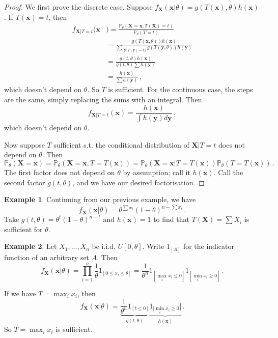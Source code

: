 \documentclass[a4paper,11pt]{article}
\theoremstyle{definition}
\newtheorem*{ex}{Example}
\numberwithin{equation}{section}
\begin{document}
\begin{proof}
We first prove the discrete case. Suppose $f_\mathbf{X}(\mathbf{x}|\theta)=g(T(\mathbf{x}),\theta)h(\mathbf{x})$. If $T(\mathbf{x})=t$, then
\begin{align*}
    f_{\mathbf{X}|T=t}(\mathbf{x}&)=\frac{\mathbb{P}_\theta(\mathbf{X}=\mathbf{x},T(\mathbf{X})=t)}{\mathbb{P}_\theta(T=t)}\\
    &=\frac{g(T(\mathbf{x},\theta))h(\mathbf{x})}{\sum_{\{\mathbf{y}:T(\mathbf{y})=t\}}g(T(\mathbf{y},\theta))h(\mathbf{y})}\\
    &=\frac{g(t,\theta)h(\mathbf{x})}{g(t,\theta)\sum h(\mathbf{y})}\\
    &=\frac{h(\mathbf{x})}{\sum h(\mathbf{y})}\,,
\end{align*}
which doesn't depend on $\theta$. So $T$ is sufficient. For the continuous case, the steps are the same, simply replacing the sums with an integral. Then
\[
f_{\mathbf{X}|T=t}(\mathbf{x})=\frac{h(\mathbf{x})}{\int h(\mathbf{y})d\mathbf{y}}\,,
\]
which doesn't depend on $\theta$.

Now suppose $T$ sufficient s.t. the conditional distribution of $\mathbf{X}|T=t$ does not depend on $\theta$. Then
\[
\mathbb{P}_\theta(\mathbf{X}=\mathbf{x})=\mathbb{P}_\theta(\mathbf{X}=\mathbf{x},T=T(\mathbf{x}))=\mathbb{P}_\theta(\mathbf{X}=\mathbf{x}|T=T(\mathbf{x}))\mathbb{P}_\theta(T=T(\mathbf{x}))\,.
\]
The first factor does not depend on $\theta$ by assumption; call it $h(\mathbf{x})$. Call the second factor $g(t,\theta)$, and we have our desired factorisation.
\end{proof}

\begin{ex}
Continuing from our previous example, we have
\[
f_\mathbf{X}(\mathbf{x}|\theta)=\theta^{\sum x_i}(1-\theta)^{n-\sum x_i}\,.
\]
Take $g(t,\theta)=\theta^t(1-\theta)^{n-t}$ and $h(\mathbf{x})=1$ to find that $T(\mathbf{X})=\sum X_i$ is sufficient for $\theta$.
\end{ex}

\begin{ex}
Let $X_1,...,X_n$ be i.i.d. $U[0,\theta]$. Write $1_{[A]}$ for the indicator function of an arbitrary set $A$. Then
\[
f_\mathbf{X}(\mathbf{x}|\theta)=\prod_{i=1}^n\frac{1}{\theta}1_{[0\leq x_i\leq\theta]}=\frac{1}{\theta^n}1_{[\max_i x_i\leq0]}1_{[\min_i x_i\geq0]}\,.
\]

If we have $T=\max_i x_i$, then
\[
f_\mathbf{X}(\mathbf{x}|\theta)=\underbrace{\frac{1}{\theta^n}1_{[t\leq0]}}_{g(t,\theta)}\underbrace{1_{[\min_i x_i\geq0}]}_{h(\mathbf{x})}\,.
\]
So $T=\max_i x_i$ is sufficient.
\end{ex}
\end{document}
